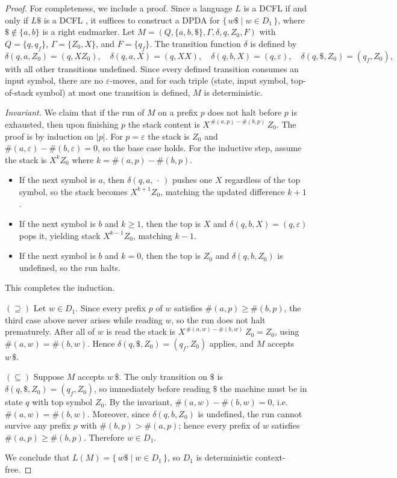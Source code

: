 \documentclass[11pt,a4paper]{article}
\begin{document}
\begin{proof}
For completeness, we include a proof.
Since a language $L$ is a DCFL if and only if $L\$$ is a DCFL
\cite{HopcroftMotwaniUllman2006}, it suffices to construct a DPDA for
$\{\,w\$\mid w\in D_1\,\}$, where $\$\notin\{a,b\}$ is a right endmarker.
Let $M=(Q,\{a,b,\$\},\Gamma,\delta,q,Z_0,F)$ with
$Q=\{q,q_f\}$, $\Gamma=\{Z_0,X\}$, and $F=\{q_f\}$.
The transition function $\delta$ is defined by
\[
  \delta(q, a, Z_0) = (q, XZ_0),\quad
  \delta(q, a, X)   = (q, XX),\quad
  \delta(q, b, X)   = (q, \varepsilon),\quad
  \delta(q, \$, Z_0) = (q_f, Z_0),
\]
with all other transitions undefined.
Since every defined transition consumes an input symbol, there are no
$\varepsilon$-moves, and for each triple (state, input symbol, top-of-stack
symbol) at most one transition is defined, $M$ is deterministic.

\smallskip
\noindent\textit{Invariant.}
We claim that if the run of $M$ on a prefix $p$ does not halt before $p$ is
exhausted, then upon finishing $p$ the stack content is
$X^{\,\#(a,p)-\#(b,p)}\,Z_0$.
The proof is by induction on $|p|$.
For $p = \varepsilon$ the stack is $Z_0$ and $\#(a,\varepsilon)-\#(b,\varepsilon)=0$,
so the base case holds.
For the inductive step, assume the stack is $X^k Z_0$ where
$k = \#(a,p)-\#(b,p)$.
\begin{itemize}
  \item If the next symbol is $a$, then $\delta(q,a,\,\cdot\,)$ pushes one
        $X$ regardless of the top symbol, so the stack becomes
        $X^{k+1}Z_0$, matching the updated difference $k+1$.
  \item If the next symbol is $b$ and $k \ge 1$, then the top is $X$ and
        $\delta(q,b,X)=(q,\varepsilon)$ pops it, yielding stack $X^{k-1}Z_0$,
        matching $k-1$.
  \item If the next symbol is $b$ and $k = 0$, then the top is $Z_0$ and
        $\delta(q,b,Z_0)$ is undefined, so the run halts.
\end{itemize}
This completes the induction.

\smallskip
\noindent$(\supseteq)$
Let $w \in D_1$.
Since every prefix $p$ of $w$ satisfies $\#(a,p) \ge \#(b,p)$, the third
case above never arises while reading $w$, so the run does not halt
prematurely.
After all of $w$ is read the stack is
$X^{\,\#(a,w)-\#(b,w)}\,Z_0 = Z_0$,
using $\#(a,w)=\#(b,w)$.
Hence $\delta(q,\$,Z_0)=(q_f,Z_0)$ applies, and $M$ accepts $w\,\$$.

\smallskip
\noindent$(\subseteq)$
Suppose $M$ accepts $w\,\$$. 
The only transition on $\$$ is $\delta(q,\$,Z_0)=(q_f,Z_0)$, so
immediately before reading $\$$ the machine must be in state $q$ with top
symbol $Z_0$.
By the invariant, $\#(a,w)-\#(b,w)=0$, i.e.\ $\#(a,w)=\#(b,w)$.
Moreover, since $\delta(q,b,Z_0)$ is undefined, the run cannot survive any
prefix $p$ with $\#(b,p)>\#(a,p)$; hence every prefix of $w$ satisfies
$\#(a,p)\ge\#(b,p)$.
Therefore $w \in D_1$.

We conclude that $L(M) = \{\,w\$ \mid w\in D_1\,\}$, so $D_1$ is
deterministic context-free.
\end{proof}
\end{document}
